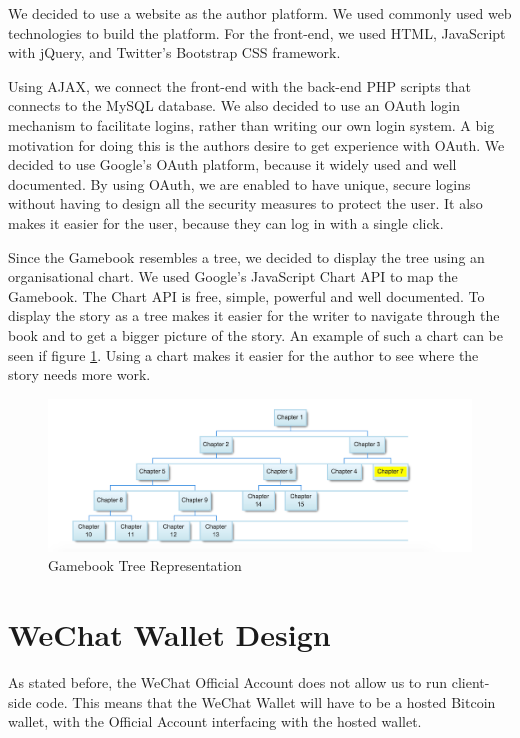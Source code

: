 We decided to use a website as the author platform. We used commonly used web technologies to build the platform. For the front-end, we used HTML, JavaScript with jQuery, and Twitter's Bootstrap CSS framework.

Using AJAX, we connect the front-end with the back-end PHP scripts that connects to the MySQL database. We also decided to use an OAuth login mechanism to facilitate logins, rather than writing our own login system. A big motivation for doing this is the authors desire to get experience with OAuth. We decided to use Google's OAuth platform, because it widely used and well documented. By using OAuth, we are enabled to have unique, secure logins without having to design all the security measures to protect the user. It also makes it easier for the user, because they can log in with a single click.

Since the Gamebook resembles a tree, we decided to display the tree using an organisational chart. We used Google's JavaScript Chart API to map the Gamebook. The Chart API is free, simple, powerful and well documented. To display the story as a tree makes it easier for the writer to navigate through the book and to get a bigger picture of the story. An example of such a chart can be seen if figure \ref{fig:gamebook_tree}. Using a chart makes it easier for the author to see where the story needs more work.

\begin{figure}
  \centering
    \includegraphics[width=\textwidth]{figs/gamebook_tree.pdf}
   \caption{Gamebook Tree Representation} 
   \label{fig:gamebook_tree}
\end{figure}


\section{WeChat Wallet Design}
\label{sct:wechat_wallet_design}

As stated before, the WeChat Official Account does not allow us to run client-side code. This means that the WeChat Wallet will have to be a hosted Bitcoin wallet, with the Official Account interfacing with the hosted wallet.

